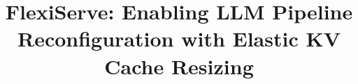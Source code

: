 \documentclass[sigplan,screen]{acmart}
\begin{document}
\title[RL-based Rescheduling of MSA Application in Cloud-Edge Continuum]{FlexiServe: Enabling LLM Pipeline Reconfiguration with Elastic KV Cache Resizing}








\end{document}
